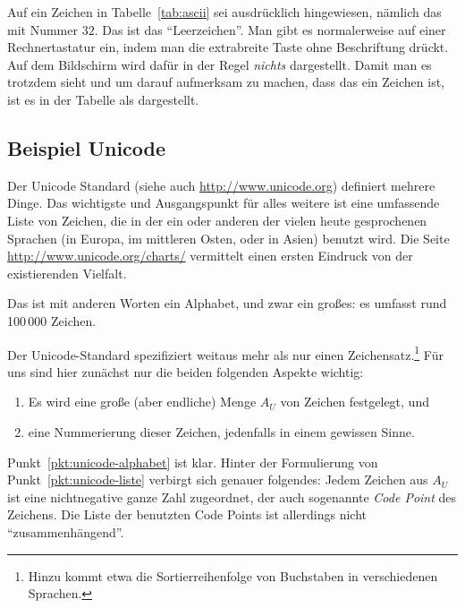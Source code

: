 %
Auf ein Zeichen in Tabelle~\ref{tab:ascii} sei ausdrücklich
hingewiesen, nämlich das mit Nummer $32$. Das ist das
"`Leerzeichen"'. Man gibt es normalerweise auf einer Rechnertastatur
ein, indem man die extrabreite Taste ohne Beschriftung drückt. Auf dem
Bildschirm wird dafür in der Regel \emph{nichts} dargestellt. Damit
man es trotzdem sieht und um darauf aufmerksam zu machen, dass das ein
Zeichen ist, ist es in der Tabelle als  dargestellt.

\subsection{Beispiel Unicode}

Der Unicode Standard (siehe auch \url{http://www.unicode.org})
definiert mehrere Dinge. Das wichtigste und Ausgangspunkt für alles
weitere ist eine umfassende Liste von Zeichen, die in der ein oder
anderen der vielen heute gesprochenen Sprachen (\zB in Europa, im
mittleren Osten, oder in Asien) benutzt wird. Die Seite
\url{http://www.unicode.org/charts/} vermittelt einen ersten Eindruck
von der existierenden Vielfalt.

Das ist mit anderen Worten ein Alphabet, und zwar ein großes: es
umfasst rund 100\,000 Zeichen.


Der Unicode-Standard spezifiziert weitaus mehr als nur einen
Zeichensatz.\footnote{Hinzu kommt etwa die Sortierreihenfolge von Buchstaben in verschiedenen Sprachen.
}
%
Für uns sind hier zunächst nur die beiden folgenden Aspekte wichtig:

\begin{enumerate}
\item \label{pkt:unicode-alphabet} Es wird eine große (aber endliche)
  Menge $A_U$ von Zeichen festgelegt, und
\item \label{pkt:unicode-liste} eine Nummerierung dieser Zeichen,
  jedenfalls in einem gewissen Sinne.
\end{enumerate}
%
Punkt~\ref{pkt:unicode-alphabet} ist klar.
%
Hinter der Formulierung von Punkt~\ref{pkt:unicode-liste} verbirgt
sich genauer folgendes: Jedem Zeichen aus $A_U$ ist eine nichtnegative
ganze Zahl zugeordnet, der auch sogenannte \emph{Code Point} des
Zeichens. Die Liste der benutzten Code Points ist allerdings nicht
"`zusammenhängend"'.

